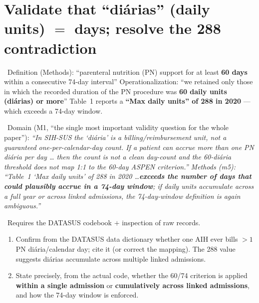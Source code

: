 \documentclass[11pt,a4paper]{article}
\newenvironment{papersays}%
  {\def\FrameCommand{{\color{rulegray}\vrule width 1.5pt}\hspace{6pt}%
     \colorbox{paperbg}}%
   \MakeFramed{\advance\hsize-\width \FrameRestore}\small}%
  {\endMakeFramed}
\newenvironment{refereesays}%
  {\def\FrameCommand{{\color{rulegray}\vrule width 1.5pt}\hspace{6pt}%
     \colorbox{refbg}}%
   \MakeFramed{\advance\hsize-\width \FrameRestore}\small\itshape}%
  {\endMakeFramed}
\begin{document}
\section{Validate that ``di\'{a}rias'' (daily units) $=$ days; resolve the 288 contradiction}

\papersaysHead\ Definition (Methods):
\begin{papersays}
``parenteral nutrition (PN) support for at least \textbf{60 days} within a consecutive
74-day interval''
\end{papersays}
Operationalization:
\begin{papersays}
``we retained only those in which the recorded duration of the PN procedure was
\textbf{60 daily units (di\'{a}rias) or more}''
\end{papersays}
Table~1 reports a \textbf{``Max daily units'' of 288 in 2020} --- which exceeds a 74-day window.

\ Domain (M1, ``the single most important validity question for the whole paper''):
\begin{refereesays}
``In SIH-SUS the `di\'{a}ria' is a billing/reimbursement unit, not a guaranteed
one-per-calendar-day count. If a patient can accrue more than one PN di\'{a}ria per day \ldots
then the count is not a clean day-count and the 60-di\'{a}ria threshold does not map 1:1 to the
60-day ASPEN criterion.''
\end{refereesays}
Methods (m5):
\begin{refereesays}
``Table~1 `Max daily units' of 288 in 2020 \ldots \textbf{exceeds the number of days that could
plausibly accrue in a 74-day window}; if daily units accumulate across a full year or across
linked admissions, the 74-day-window definition is again ambiguous.''
\end{refereesays}

\whyHead\ Requires the DATASUS codebook $+$ inspection of raw records.

\opHead
\begin{enumerate}[leftmargin=*, topsep=2pt]
  \item Confirm from the DATASUS data dictionary whether one AIH ever bills $>1$ PN
        di\'{a}ria/calendar day; cite it (or correct the mapping). The 288 value suggests
        di\'{a}rias accumulate across multiple linked admissions.
  \item State precisely, from the actual code, whether the 60/74 criterion is applied
        \textbf{within a single admission} or \textbf{cumulatively across linked admissions},
        and how the 74-day window is enforced.
\end{enumerate}
\end{document}
